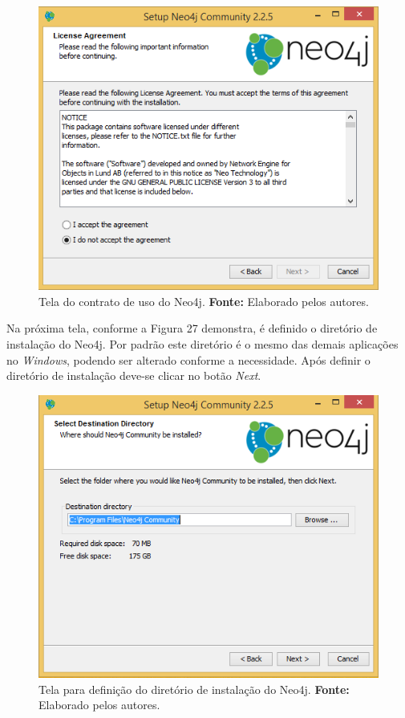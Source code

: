 \newpage
\begin{figure}[h!]
	\centerline{\includegraphics[scale=0.4]{./imagens/neo4j-install-step2.png}}
	\caption[Tela do contrato de uso do Neo4j]
	{Tela do contrato de uso do Neo4j. \textbf{Fonte:} Elaborado pelos autores.}
	\label{fig:exemplo1}
\end{figure}

\par Na próxima tela, conforme a Figura 27 demonstra, é definido o diretório de instalação do Neo4j. Por padrão este diretório é o mesmo das demais aplicações no \textit{Windows}, podendo ser alterado conforme a necessidade. Após definir o diretório de instalação deve-se clicar no botão \textit{Next}.

\begin{figure}[h!]
	\centerline{\includegraphics[scale=0.4]{./imagens/neo4j-install-step3.png}}
	\caption[Tela para definição do diretório de instalação do Neo4j]
	{Tela para definição do diretório de instalação do Neo4j. \textbf{Fonte:} Elaborado pelos autores.}
	\label{fig:exemplo1}
\end{figure}

